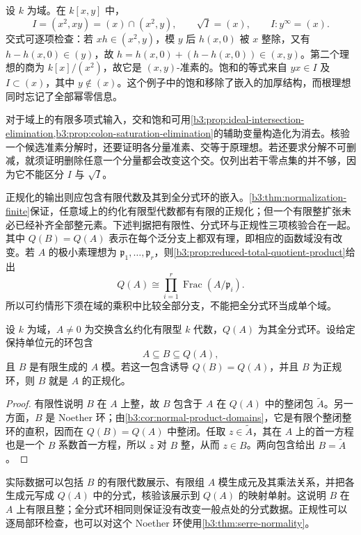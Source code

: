 \begin{example}\label{b3:exm:B-decomposition}
	设 \(k\) 为域。在 \(k[x,y]\) 中，
	\[
		I=(x^2,xy)=(x)\cap(x^2,y),\qquad \sqrt I=(x),\qquad I:y^\infty=(x).
	\]
	交式可逐项检查：若 \(xh\in(x^2,y)\)，模 \(y\) 后 \(h(x,0)\) 被 \(x\) 整除，又有 \(h-h(x,0)\in(y)\)，故 \(h=h(x,0)+(h-h(x,0))\in(x,y)\)。第二个理想的商为 \(k[x]/(x^2)\)，故它是 \((x,y)\)-准素的。饱和的等式来自 \(yx\in I\) 及 \(I\subset(x)\)，其中 \(y\notin(x)\)。这个例子中的饱和移除了嵌入的加厚结构，而根理想同时忘记了全部幂零信息。
\end{example}

对于域上的有限多项式输入，交和饱和可用\cref{b3:prop:ideal-intersection-elimination,b3:prop:colon-saturation-elimination}的辅助变量构造化为消去。核验一个候选准素分解时，还要证明各分量准素、交等于原理想。若还要求分解不可删减，就须证明删除任意一个分量都会改变这个交。仅列出若干零点集的并不够，因为它不能区分 \(I\) 与 \(\sqrt I\)。

\ProseParagraphBreak
正规化的输出则应包含有限代数及其到全分式环的嵌入。\cref{b3:thm:normalization-finite}保证，任意域上的约化有限型代数都有有限的正规化；但一个有限整扩张未必已经补齐全部整元素。下述判据把有限性、分式环与正规性三项核验合在一起。其中 \(Q(B)=Q(A)\) 表示在每个泛分支上都双有理，即相应的函数域没有改变。若 \(A\) 的极小素理想为 \(\mathfrak p_1,\ldots,\mathfrak p_r\)，则\cref{b3:prop:reduced-total-quotient-product}给出
\[
	Q(A)\cong\prod_{i=1}^r\operatorname{Frac}(A/\mathfrak p_i).
\]
所以可约情形下须在域的乘积中比较全部分支，不能把全分式环当成单个域。

\begin{proposition}[正规化输出的认证]\label{b3:prop:B-normalization-certificate}
	设 \(k\) 为域，\(A\ne0\) 为交换含幺约化有限型 \(k\) 代数，\(Q(A)\) 为其全分式环。设给定保持单位元的环包含
	\[
		A\subseteq B\subseteq Q(A),
	\]
	且 \(B\) 是有限生成的 \(A\) 模。若这一包含诱导 \(Q(B)=Q(A)\)，并且 \(B\) 为正规环，则 \(B\) 就是 \(A\) 的正规化。
\end{proposition}
\begin{proof}
	有限性说明 \(B\) 在 \(A\) 上整，故 \(B\) 包含于 \(A\) 在 \(Q(A)\) 中的整闭包 \(\widetilde A\)。另一方面，\(B\) 是 Noether 环；由\cref{b3:cor:normal-product-domains}，它是有限个整闭整环的直积，因而在 \(Q(B)=Q(A)\) 中整闭。任取 \(z\in\widetilde A\)，其在 \(A\) 上的首一方程也是一个 \(B\) 系数首一方程，所以 \(z\) 对 \(B\) 整，从而 \(z\in B\)。两向包含给出 \(B=\widetilde A\)。
\end{proof}

实际数据可以包括 \(B\) 的有限代数展示、有限组 \(A\) 模生成元及其乘法关系，并把各生成元写成 \(Q(A)\) 中的分式，核验该展示到 \(Q(A)\) 的映射单射。这说明 \(B\) 在 \(A\) 上有限且整；全分式环相同则保证没有改变一般点处的分式数据。正规性可以逐局部环检查，也可以对这个 Noether 环使用\cref{b3:thm:serre-normality}。

